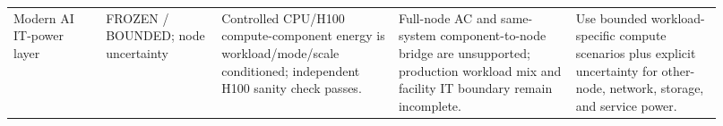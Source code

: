 \begin{longtable}{@{}p{0.120\linewidth}p{0.150\linewidth}p{0.230\linewidth}p{0.230\linewidth}p{0.190\linewidth}@{}}
Modern AI IT-power layer & FROZEN / BOUNDED; node uncertainty & Controlled CPU/H100 compute-component energy is workload/mode/scale conditioned; independent H100 sanity check passes. & Full-node AC and same-system component-to-node bridge are unsupported; production workload mix and facility IT boundary remain incomplete. & Use bounded workload-specific compute scenarios plus explicit uncertainty for other-node, network, storage, and service power. \\
\end{longtable}
\endgroup
